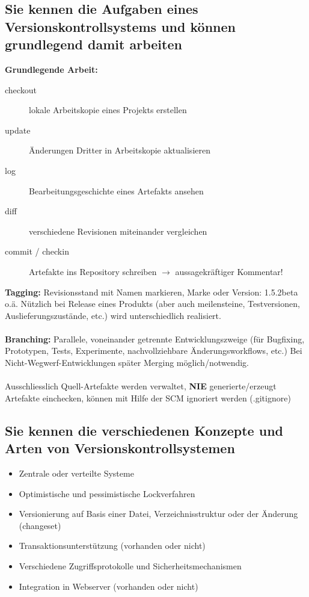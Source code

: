 \documentclass[a4paper]{article}
\begin{document}
		\subsection{Sie kennen die Aufgaben eines Versionskontrollsystems und können grundlegend damit arbeiten}
		\textbf{Grundlegende Arbeit:}
		\begin{description}
			\item[checkout] lokale Arbeitskopie eines Projekts erstellen
			\item[update] Änderungen Dritter in Arbeitskopie aktualisieren
			\item[log] Bearbeitungsgeschichte eines Artefakts ansehen
			\item[diff] verschiedene Revisionen miteinander vergleichen
			\item[commit / checkin] Artefakte ins Repository schreiben $\rightarrow$ aussagekräftiger Kommentar!
		\end{description}
		\textbf{Tagging:} Revisionsstand mit Namen markieren, Marke oder Version: 1.5.2beta o.ä. Nützlich bei Release eines Produkts (aber auch meilensteine, Testversionen, Auslieferungszustände, etc.) wird unterschiedlich realisiert.\\
		\\
		\textbf{Branching:} Parallele, voneinander getrennte Entwicklungszweige (für Bugfixing, Prototypen, Tests, Experimente, nachvollziehbare Änderungsworkflows, etc.) Bei Nicht-Wegwerf-Entwicklungen später Merging möglich/notwendig.\\
		\\
		Ausschliesslich Quell-Artefakte werden verwaltet, \textbf{NIE} generierte/erzeugt Artefakte einchecken, können mit Hilfe der SCM ignoriert werden (.gitignore)
		
		\subsection{Sie kennen die verschiedenen Konzepte und Arten von Versionskontrollsystemen}
		\begin{itemize}
			\item Zentrale oder verteilte Systeme 
			\item Optimistische und pessimistische Lockverfahren 
			\item Versionierung auf Basis einer Datei, Verzeichnisstruktur oder der Änderung (changeset) 
			\item Transaktionsunterstützung (vorhanden oder nicht) 
			\item Verschiedene Zugriffsprotokolle und Sicherheitsmechanismen 
			\item Integration in Webserver (vorhanden oder nicht)
		\end{itemize}
		
\end{document}
